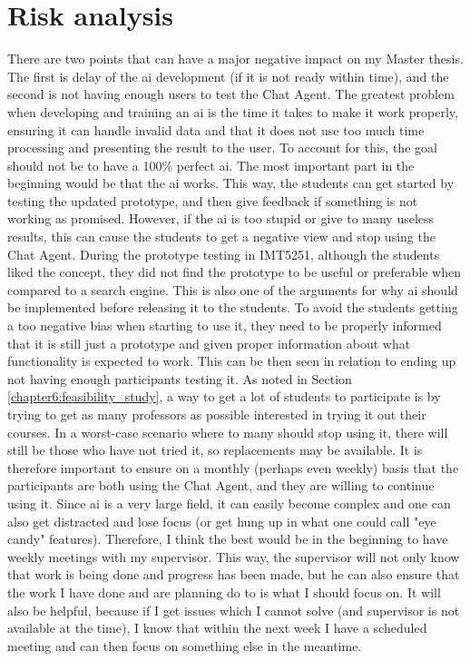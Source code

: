 \chapter{Risk analysis}
\label{chapter7:risk_analysis}
There are two points that can have a major negative impact on my Master thesis. The first is delay of the \gls{ai} development (if it is not ready within time), and the 
second is not having enough users to test the Chat Agent. The greatest problem when developing and training an \gls{ai} is the time it takes to make it work 
properly, ensuring it can handle invalid data and that it does not use too much time processing and presenting the result to the user. To account for this, 
the goal should not be to have a 100\% perfect \gls{ai}. The most important part in the beginning would be that the \gls{ai} works. This way, the students 
can get started by testing the updated prototype, and then give feedback if something is not working as promised. However, if the 
\gls{ai} is too stupid or give to many useless results, this can cause the students to get a negative view and stop using the Chat Agent. 
\vspace{0.5em}\newline
During the prototype testing in IMT5251, although the students liked the concept, they did not find the prototype to be useful or preferable when compared to a search engine. 
This is also one of the arguments for why \gls{ai} should be implemented before releasing it to the students. To avoid the students getting a too negative bias when starting 
to use it, they need to be properly informed that it is still just a prototype and given proper information about what functionality is expected to work. This can be then 
seen in relation to ending up not having enough participants testing it. As noted in Section \ref{chapter6:feasibility_study}, a way to get a lot of students to participate is
by trying to get as many professors as possible interested in trying it out their courses. In a worst-case scenario where to many should stop using it, there will still be those 
who have not tried it, so replacements may be available. It is therefore important to ensure on a monthly (perhaps even weekly) basis that the participants are both using the 
Chat Agent, and they are willing to continue using it.
\vspace{0.5em}\newline
Since \gls{ai} is a very large field, it can easily become complex and one can also get distracted and lose focus (or get hung up in what one could call "eye candy" 
features). Therefore, I think the best would be in the beginning to have weekly meetings with my supervisor. This way, the supervisor will not only know that work is being done
and progress has been made, but he can also ensure that the work I have done and are planning do to is what I should focus on. It will also be helpful, because if I get issues which 
I cannot solve (and supervisor is not available at the time), I know that within the next week I have a scheduled meeting and can then focus on something else in the meantime.


